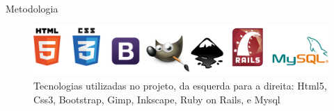 \documentclass[final]{beamer} %
\begin{document}
\begin{frame}[t]
\begin{columns}[t]
\begin{column}{0.60\paperwidth}
\begin{block}{Metodologia}
   		\begin{figure}[ht]
   			\begin{center}
   				\includegraphics[width=1.0\textwidth]{./figures/tecnologias}
   				\caption{Tecnologias utilizadas no projeto, da esquerda para a direita: Html5, Css3, Bootstrap, Gimp, Inkscape, Ruby on Rails, e Mysql \label{fig:tecnologias}}
   			\end{center}
   		\end{figure}
		   		

\end{block}
\end{column}
\end{columns}
\end{frame}
\end{document}
